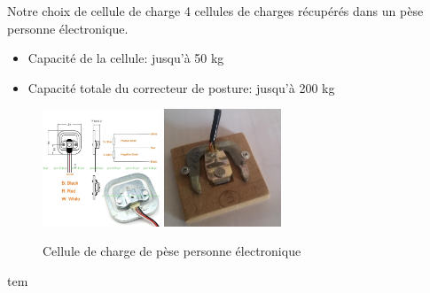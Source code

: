 \documentclass{beamer}
\begin{document}
\begin{frame}
\begin{block}{Notre choix de cellule de charge}
4 cellules de charges récupérés dans un pèse personne électronique.
\begin{itemize}
\item Capacité de la cellule: jusqu'à 50 kg 
\item Capacité totale du correcteur de posture: jusqu'à 200 kg
\end{itemize}
\begin{figure}
\begin{center}
\includegraphics[height=3.5cm]{images/load_sensor.jpg}
\includegraphics[height=3.5cm]{images/load_sensor2.jpg}
\end{center}
\caption{Cellule de charge de pèse personne électronique}
\label{fig:load_cell_1}
\end{figure}
\end{block}
tem\end{frame}
\end{document}
